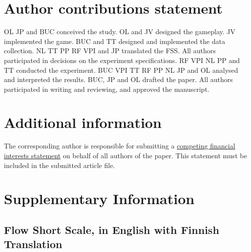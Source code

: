\documentclass[fleqn,10pt]{wlscirep}
\begin{document}
\section*{Author contributions statement}
OL JP and BUC conceived the study.
OL and JV designed the gameplay.
JV implemented the game.
BUC and TT designed and implemented the data collection.
NL TT PP RF VPI and JP translated the FSS.
All authors participated in decisions on the experiment specifications.
RF VPI NL PP and TT conducted the experiment.
BUC VPI TT RF PP NL JP and OL analysed and interpreted the results.
BUC, JP and OL drafted the paper.
All authors participated in writing and reviewing, and approved the manuscript.


\section*{Additional information}

The corresponding author is responsible for submitting a \href{http://www.nature.com/srep/policies/index.html#competing}{competing financial interests statement} on behalf of all authors of the paper. This statement must be included in the submitted article file.

\section*{Supplementary Information}

\subsection*{Flow Short Scale, in English with Finnish Translation}
\end{document}
